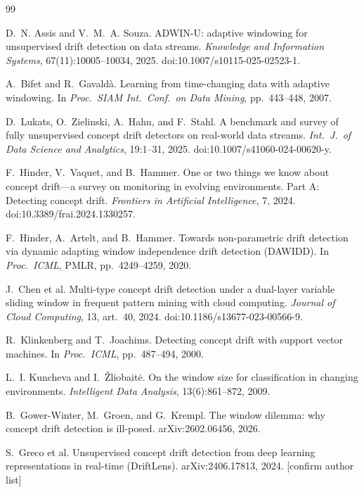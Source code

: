 \documentclass[11pt,a4paper]{article}
\newcommand{\todo}[1]{\textcolor{red!70!black}{[#1]}}
\begin{document}
\begin{thebibliography}{99}\small

 D.~N. Assis and V.~M.~A. Souza. ADWIN-U: adaptive windowing for unsupervised drift detection on data streams. \emph{Knowledge and Information Systems}, 67(11):10005--10034, 2025. doi:10.1007/s10115-025-02523-1.

 A.~Bifet and R.~Gavald\`a. Learning from time-changing data with adaptive windowing. In \emph{Proc.\ SIAM Int.\ Conf.\ on Data Mining}, pp.\ 443--448, 2007.

 D.~Lukats, O.~Zielinski, A.~Hahn, and F.~Stahl. A benchmark and survey of fully unsupervised concept drift detectors on real-world data streams. \emph{Int.\ J.\ of Data Science and Analytics}, 19:1--31, 2025. doi:10.1007/s41060-024-00620-y.

 F.~Hinder, V.~Vaquet, and B.~Hammer. One or two things we know about concept drift---a survey on monitoring in evolving environments. Part A: Detecting concept drift. \emph{Frontiers in Artificial Intelligence}, 7, 2024. doi:10.3389/frai.2024.1330257.

 F.~Hinder, A.~Artelt, and B.~Hammer. Towards non-parametric drift detection via dynamic adapting window independence drift detection (DAWIDD). In \emph{Proc.\ ICML}, PMLR, pp.\ 4249--4259, 2020.

 J.~Chen et al. Multi-type concept drift detection under a dual-layer variable sliding window in frequent pattern mining with cloud computing. \emph{Journal of Cloud Computing}, 13, art.~40, 2024. doi:10.1186/s13677-023-00566-9.

 R.~Klinkenberg and T.~Joachims. Detecting concept drift with support vector machines. In \emph{Proc.\ ICML}, pp.\ 487--494, 2000.

 L.~I. Kuncheva and I.~\v{Z}liobait\.{e}. On the window size for classification in changing environments. \emph{Intelligent Data Analysis}, 13(6):861--872, 2009.

 B.~Gower-Winter, M.~Groen, and G.~Krempl. The window dilemma: why concept drift detection is ill-posed. arXiv:2602.06456, 2026.

 S.~Greco et al. Unsupervised concept drift detection from deep learning representations in real-time (DriftLens). arXiv:2406.17813, 2024. \todo{confirm author list}


\end{thebibliography}
\end{document}
